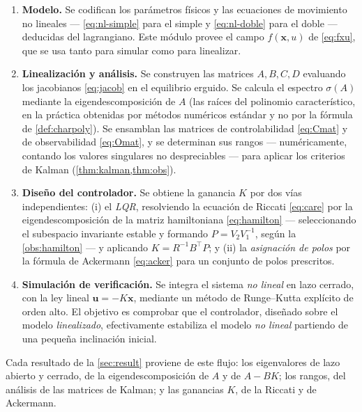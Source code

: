 \documentclass[11pt,letterpaper]{article}
\theoremstyle{definition}
\theoremstyle{plain}
\theoremstyle{remark}
\newcommand{\xv}{\bm{x}}
\newcommand{\uv}{\bm{u}}
\begin{document}
\begin{enumerate}
  \item \textbf{Modelo.} Se codifican los parámetros físicos y las
  ecuaciones de movimiento no lineales --- \cref{eq:nl-simple} para el
  simple y \cref{eq:nl-doble} para el doble --- deducidas del lagrangiano.
  Este módulo provee el campo $f(\xv,u)$ de \cref{eq:fxu}, que se usa
  tanto para simular como para linealizar.

  \item \textbf{Linealización y análisis.} Se construyen las matrices
  $A,B,C,D$ evaluando los jacobianos \cref{eq:jacob} en el equilibrio
  erguido. Se calcula el espectro $\sigma(A)$ mediante la
  eigendescomposición de $A$ (las raíces del polinomio característico, en
  la práctica obtenidas por métodos numéricos estándar y no por la
  fórmula de \cref{def:charpoly}). Se ensamblan las matrices de
  controlabilidad \cref{eq:Cmat} y de observabilidad \cref{eq:Omat}, y se
  determinan sus rangos --- numéricamente, contando los valores
  singulares no despreciables --- para aplicar los criterios de Kalman
  (\cref{thm:kalman,thm:obs}).

  \item \textbf{Diseño del controlador.} Se obtiene la ganancia $K$ por
  dos vías independientes: (i) el \emph{LQR}, resolviendo la ecuación de
  Riccati \cref{eq:care} por la eigendescomposición de la matriz
  hamiltoniana \cref{eq:hamilton} --- seleccionando el subespacio
  invariante estable y formando $P=V_2V_1^{-1}$, según la
  \cref{obs:hamilton} --- y aplicando $K=R^{-1}B^\top P$; y (ii) la
  \emph{asignación de polos} por la fórmula de Ackermann \cref{eq:acker}
  para un conjunto de polos prescritos.

  \item \textbf{Simulación de verificación.} Se integra el sistema
  \emph{no lineal} en lazo cerrado, con la ley lineal $\uv=-K\xv$,
  mediante un método de Runge--Kutta explícito de orden alto. El objetivo
  es comprobar que el controlador, diseñado sobre el modelo
  \emph{linealizado}, efectivamente estabiliza el modelo \emph{no lineal}
  partiendo de una pequeña inclinación inicial.
\end{enumerate}

Cada resultado de la \cref{sec:result} proviene de este flujo: los
eigenvalores de lazo abierto y cerrado, de la eigendescomposición de $A$
y de $A-BK$; los rangos, del análisis de las matrices de Kalman; y las
ganancias $K$, de la Riccati y de Ackermann.
\end{document}
